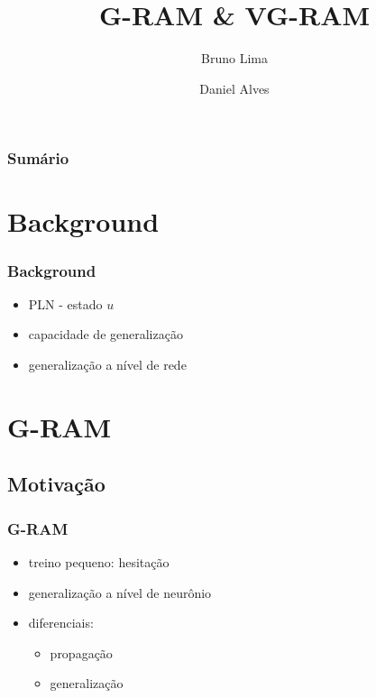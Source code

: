 \documentclass{beamer}
\title{G-RAM \& VG-RAM}
\author{Bruno Lima \and Daniel Alves}
\date{}
\begin{document}
\titlepage

\begin{frame}
    \frametitle{Sumário}
    \tableofcontents
\end{frame}
\section{Background}
\begin{frame}
    \frametitle{Background}
    \begin{itemize}
        \item PLN - estado $u$
        \item capacidade de generalização
        \item generalização a nível de rede
    \end{itemize}
\end{frame}
\section{G-RAM}
\subsection{Motivação}
\begin{frame}
    \frametitle{G-RAM}
    \begin{itemize}
        \item treino pequeno: hesitação
        \item generalização a nível de neurônio
        \item diferenciais:
            \begin{itemize}
                \item propagação
                \item generalização
            \end{itemize}
    \end{itemize}
\end{frame}
\end{document}
